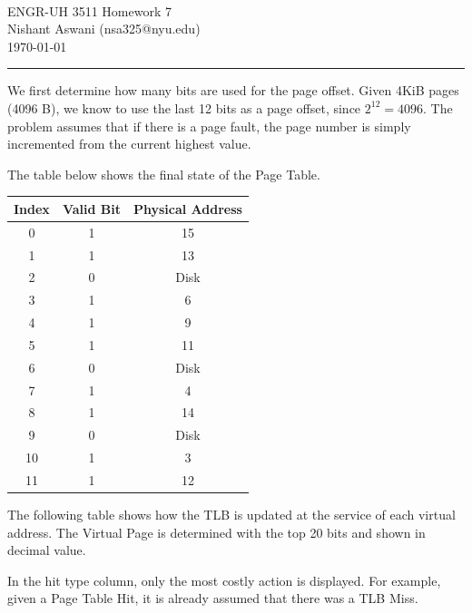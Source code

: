 \documentclass[11pt]{exam}
\makeatletter
\newcommand{\myname}{Nishant Aswani}
\newcommand{\myemail}{nsa325@nyu.edu}
\newcommand{\myhwtype}{Homework}
\newcommand{\myhwnum}{7}
\newcommand{\mycoursenumber}{ENGR-UH 3511}
\newcounter{questionCounter}
\newcounter{partCounter}[questionCounter]
\newenvironment{namedquestion}[1]{%
    \addtocounter{questionCounter}{1}%
    \setcounter{partCounter}{0}%
    \vspace{.2in}%
        \noindent{\bf #1}%
    \vspace{0.3em} \hrule \vspace{.1in}%
}{}
\makeatother
\begin{document}
\

{\newpage}


\thispagestyle{plain}
\begin{center}
  {\Large \mycoursenumber{} \myhwtype{} \myhwnum} \\
  \myname{} (\myemail{}) \\
  \today
\end{center}

\setcounter{questionCounter}{0}

\begin{namedquestion}{Question 5.11.1}

We first determine how many bits are used for the page offset. Given 4KiB pages (4096 B), we know to use the last 12 bits as a page offset, since $2^{12} = 4096$.  The problem assumes that if there is a page fault, the page number is simply incremented from the current highest value.

The table below shows the final state of the Page Table.\\

\begingroup
    \centering
    \def\arraystretch{1.5}
        \begin{tabular}{ccc}
            \toprule
            Index & Valid Bit & Physical Address\\
            \midrule
            0 & 1 & 15\\
            1 & 1 & 13 \\
            2 & 0 & Disk \\
            3 & 1 & 6 \\
            4 & 1 & 9 \\
            5 & 1 & 11 \\
            6 & 0 & Disk \\
            7 & 1 & 4 \\
            8 & 1 & 14 \\
            9 & 0 & Disk \\
            10 & 1 & 3 \\
            11 & 1 & 12\\
            \bottomrule
        \end{tabular}
    \label{fig:cacheTable}
    \medskip
\endgroup



\newpage
The following table shows how the TLB is updated at the service of each virtual address. The Virtual Page is determined with the top 20 bits and shown in decimal value. 

In the hit type column, only the most costly action is displayed. For example, given a Page Table Hit, it is already assumed that there was a TLB Miss.\\


\end{namedquestion}
\end{document}
